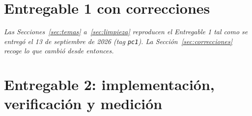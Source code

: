 \documentclass[12pt,a4paper]{article}
\begin{document}


\tableofcontents
\clearpage




\part{Entregable 1 con correcciones}\label{parte:pc1}
\noindent\emph{Las Secciones~\ref{sec:temas} a~\ref{sec:limpieza} reproducen el Entregable 1 tal
como se entregó el 13 de septiembre de 2026 (tag \texttt{pc1}). La Sección~\ref{sec:correcciones}
recoge lo que cambió desde entonces.}





\part{Entregable 2: implementación, verificación y medición}\label{parte:pc2}










\clearpage
\printbibliography[title={Referencias}]
\end{document}
